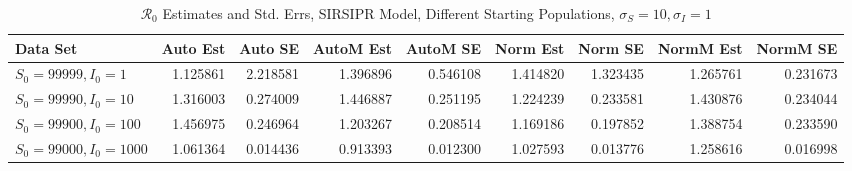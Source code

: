 \documentclass[12pt]{article}
\newcommand{\rr}{\ensuremath{\mathcal{R}_0}}
\begin{document}
\begin{table}[H]
	
	\caption{$\rr$ Estimates and Std. Errs, SIRSIPR Model,
		Different Starting Populations, 
		$\sigma_S = 10, \sigma_I = 1$}
	\begin{footnotesize}
		\hskip -1.7cm
	\begin{tabular}{l|r|r|r|r|r|r|r|r}
		\hline
		Data Set & Auto Est & Auto SE & AutoM Est & AutoM SE & Norm Est & Norm SE & NormM Est & NormM SE\\
		\hline
		$S_0 = 99999, I_0 = 1$ & 1.125861 & 2.218581 & 1.396896 & 0.546108 & 1.414820 & 1.323435 & 1.265761 & 0.231673\\
		\hline
		$S_0 = 99990, I_0 = 10$ & 1.316003 & 0.274009 & 1.446887 & 0.251195 & 1.224239 & 0.233581 & 1.430876 & 0.234044\\
		\hline
		$S_0 = 99900, I_0 = 100$ & 1.456975 & 0.246964 & 1.203267 & 0.208514 & 1.169186 & 0.197852 & 1.388754 & 0.233590\\
		\hline
		$S_0 = 99000, I_0 = 1000$ & 1.061364 & 0.014436 & 0.913393 & 0.012300 & 1.027593 & 0.013776 & 1.258616 & 0.016998\\
		\hline
	\end{tabular}
\end{footnotesize}
\end{table}
\end{document}

